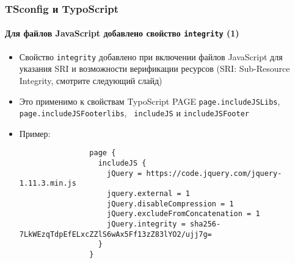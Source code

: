 \begin{frame}[fragile]
	\frametitle{TSconfig и TypoScript}
	\framesubtitle{Для файлов JavaScript добавлено свойство \texttt{integrity} (1)}

	\lstset{basicstyle=\tiny\ttfamily}

	\begin{itemize}

		\item Свойство \texttt{integrity} добавлено при включении файлов JavaScript для
			указания SRI и возможности верификации ресурсов\newline
			(SRI: Sub-Resource Integrity, смотрите следующий слайд)

		\item Это применимо к свойствам TypoScript PAGE \texttt{page.includeJSLibs},
			\texttt{page.includeJSFooterlibs}, \texttt{ includeJS} и
			\texttt{includeJSFooter}

		\item Пример:

			\begin{lstlisting}
				page {
				  includeJS {
				    jQuery = https://code.jquery.com/jquery-1.11.3.min.js
				    jquery.external = 1
				    jQuery.disableCompression = 1
				    jQuery.excludeFromConcatenation = 1
				    jQuery.integrity = sha256-7LkWEzqTdpEfELxcZZlS6wAx5Ff13zZ83lYO2/ujj7g=
				  }
				}
			\end{lstlisting}

	\end{itemize}

\end{frame}


